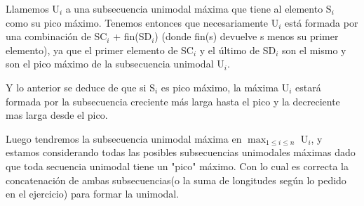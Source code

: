 Llamemos U${_i}$ a una subsecuencia unimodal máxima que tiene al elemento S${_i}$ como su pico máximo.
Tenemos entonces que necesariamente U${_i}$ está formada por una combinación de SC${_i}$ + fin(SD${_i}$) (donde fin(s) devuelve s menos su primer elemento), ya que el primer elemento de SC${_i}$ y el último de SD${_i}$ son el mismo y son el pico máximo de la subsecuencia unimodal U${_i}$.

Y lo anterior se deduce de que si S{$_i$} es pico máximo, la máxima U${_i}$ estará formada por la subsecuencia creciente más larga hasta el pico y la decreciente mas larga desde el pico. 

Luego tendremos la subsecuencia unimodal máxima en $\max_{1\leq i\leq n}$ U${_i}$, y estamos considerando todas las posibles subsecuencias unimodales máximas dado que toda secuencia unimodal tiene un "pico" máximo.
Con lo cual es correcta la concatenación de ambas subsecuencias(o la suma de longitudes según lo pedido en el ejercicio) para formar la unimodal. 
